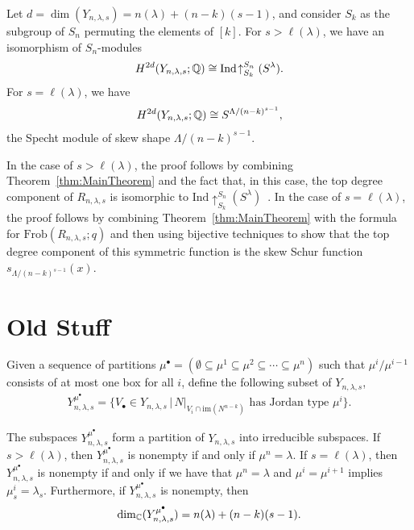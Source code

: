 \documentclass[12pt]{amsart}
\newcommand{\st}{\,|\,}
\newcommand{\Frob}{\mathrm{Frob}}
\newcommand{\la}{\lambda}
\newcommand{\im}{\mathrm{im}}
\begin{document}
\begin{theorem}
Let $d = \dim(Y_{n,\la,s}) = n(\la) + (n-k)(s-1)$, and consider $S_k$ as the subgroup of $S_n$ permuting the elements of $[k]$. For $s>\ell(\la)$, we have an isomorphism of $S_n$-modules
\begin{align}
H^{2d}(Y_{n,\la,s};\bQ) \cong \mathrm{Ind}\!\uparrow_{S_k}^{S_n} (S^\la).
\end{align}
For $s=\ell(\la)$, we have
\begin{align}\label{eq:SLengthLambdaIso}
    H^{2d}(Y_{n,\la,s};\bQ) \cong S^{\Lambda/(n-k)^{s-1}},
\end{align}
the Specht module of skew shape $\Lambda/(n-k)^{s-1}$.
\end{theorem}

In the case of $s>\ell(\la)$, the proof follows by combining Theorem~\ref{thm:MainTheorem} and the fact that, in this case, the top degree component of $R_{n,\lambda,s}$ is isomorphic to $\mathrm{Ind}\!\!\uparrow_{S_k}^{S_n}(S^\lambda)$~\cite[Corollary 3.3.15]{GriffinThesis}. In the case of $s=\ell(\la)$, the proof follows by combining Theorem~\ref{thm:MainTheorem} with the formula \cite[Theorem 5.13]{GriffinOSP} for $\Frob(R_{n,\lambda,s};q)$ and then using bijective techniques to show that the top degree component of this symmetric function is the skew Schur function $s_{\Lambda/(n-k)^{s-1}}(x)$.


\section{Old Stuff}




Given a sequence of partitions $\mu^\bullet = (\emptyset\subseteq \mu^{1}\subseteq \mu^{2}\subseteq \cdots \subseteq \mu^{n})$ such that $\mu^{i}/\mu^{i-1}$ consists of at most one box for all $i$, define the following subset of $Y_{n,\la,s}$,
\begin{align}
Y_{n,\la,s}^{\mu^\bullet} = \{V_\bullet \in Y_{n,\la,s} \st N|_{V_i\cap \im(N^{n-k})}\text{ has Jordan type }\mu^{i}\}.
\end{align}

\begin{lemma}
The subspaces $Y_{n,\la,s}^{\mu^\bullet}$ form a partition of $Y_{n,\la,s}$ into irreducible subspaces. If $s>\ell(\la)$, then $Y_{n,\la,s}^{\mu^\bullet}$ is nonempty if and only if $\mu^{n} = \la$. If $s = \ell(\la)$, then $Y_{n,\la,s}^{\mu^\bullet}$ is nonempty if and only if we have that $\mu^{n} = \la$ and $\mu^{i} = \mu^{i+1}$ implies $\mu^{i}_s = \la_s$. Furthermore, if $Y_{n,\la,s}^{\mu^\bullet}$ is nonempty, then
\begin{align}\label{eq:DimFormulaForCmpt}
\dim_\bC(Y_{n,\la,s}^{\mu^\bullet}) = n(\la) + (n-k)(s-1).
\end{align}
\end{lemma}
\end{document}
